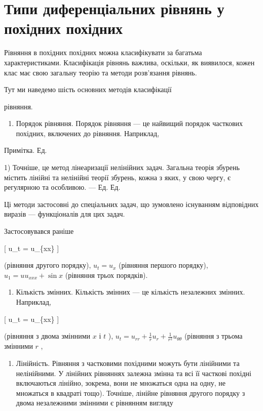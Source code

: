 \documentclass[
]{article}
\providecommand{\tightlist}{%
  \setlength{\itemsep}{0pt}\setlength{\parskip}{0pt}}
\begin{document}
\section{Типи диференціальних рівнянь у похідних
похідних}\label{ux442ux438ux43fux438-ux434ux438ux444ux435ux440ux435ux43dux446ux456ux430ux43bux44cux43dux438ux445-ux440ux456ux432ux43dux44fux43dux44c-ux443-ux43fux43eux445ux456ux434ux43dux438ux445-ux43fux43eux445ux456ux434ux43dux438ux445}

Рівняння в похідних похідних можна класифікувати за багатьма
характеристиками. Класифікація рівнянь важлива, оскільки, як виявилося,
кожен клас має свою загальну теорію та методи розв'язання рівнянь.

Тут ми наведемо шість основних методів класифікації

рівняння.

\begin{enumerate}
\def\labelenumi{\arabic{enumi}.}
\tightlist
\item
  Порядок рівняння. Порядок рівняння --- це найвищий порядок часткових
  похідних, включених до рівняння. Наприклад,
\end{enumerate}

Примітка. Ед.

1) Точніше, це метод лінеаризації нелінійних задач. Загальна теорія
збурень містить лінійні та нелінійні теорії збурень, кожна з яких, у
свою чергу, є регулярною та особливою. --- Ед. Ед.

Ці методи застосовні до спеціальних задач, що зумовлено існуванням
відповідних виразів --- функціоналів для цих задач.

Застосовувався раніше

{[} u\_t = u\_\{xx\} {]}

(рівняння другого порядку), \(u_t = u_x\) (рівняння першого порядку),
\(u_1 = uu_{xxx} + \sin x\) (рівняння трьох порядків).

\begin{enumerate}
\def\labelenumi{\arabic{enumi}.}
\setcounter{enumi}{1}
\tightlist
\item
  Кількість змінних. Кількість змінних --- це кількість незалежних
  змінних. Наприклад,
\end{enumerate}

{[} u\_t = u\_\{xx\} {]}

(рівняння з двома змінними \(x\) і \(t\) ),
\(u_t = u_{rr} + \frac{1}{r} u_r + \frac{1}{r^2} u_{\theta\theta}\)
(рівняння з трьома змінними \(r\) ,

\begin{enumerate}
\def\labelenumi{\arabic{enumi}.}
\setcounter{enumi}{2}
\tightlist
\item
  Лінійність. Рівняння з частковими похідними можуть бути лінійними та
  нелінійними. У лінійних рівняннях залежна змінна та всі її часткові
  похідні включаються лінійно, зокрема, вони не множаться одна на одну,
  не множаться в квадраті тощо). Точніше, лінійне рівняння другого
  порядку з двома незалежними змінними є рівнянням вигляду
\end{enumerate}
\end{document}
